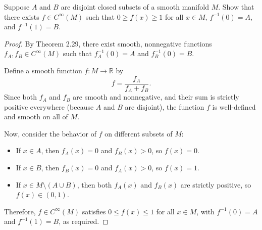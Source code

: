 \begin{problem}
    Suppose $A$ and $B$ are disjoint closed subsets of a smooth manifold $M$. Show that there exists $f \in C^\infty(M)$ such that $0 \geq f(x) \geq 1$ for all $x \in M$, $f^{-1}(0) = A$, and $f^{-1}(1) = B$.

    \begin{proof}
        By Theorem 2.29, there exist smooth, nonnegative functions $f_A, f_B \in C^\infty(M)$ such that $f_A^{-1}(0) = A$ and $f_B^{-1}(0) = B$.

        Define a smooth function $f \colon M \to \mathbb{R}$ by
        \[
            f = \frac{f_A}{f_A + f_B}.
        \]
        Since both $f_A$ and $f_B$ are smooth and nonnegative, and their sum is strictly positive everywhere (because $A$ and $B$ are disjoint), the function $f$ is well-defined and smooth on all of $M$.

        Now, consider the behavior of $f$ on different subsets of $M$:
        \begin{itemize}
            \item If $x \in A$, then $f_A(x) = 0$ and $f_B(x) > 0$, so $f(x) = 0$.
            \item If $x \in B$, then $f_B(x) = 0$ and $f_A(x) > 0$, so $f(x) = 1$.
            \item If $x \in M \setminus (A \cup B)$, then both $f_A(x)$ and $f_B(x)$ are strictly positive, so $f(x) \in (0,1)$.
        \end{itemize}
        Therefore, $f \in C^\infty(M)$ satisfies $0 \leq f(x) \leq 1$ for all $x \in M$, with $f^{-1}(0) = A$ and $f^{-1}(1) = B$, as required.
    \end{proof}
\end{problem}